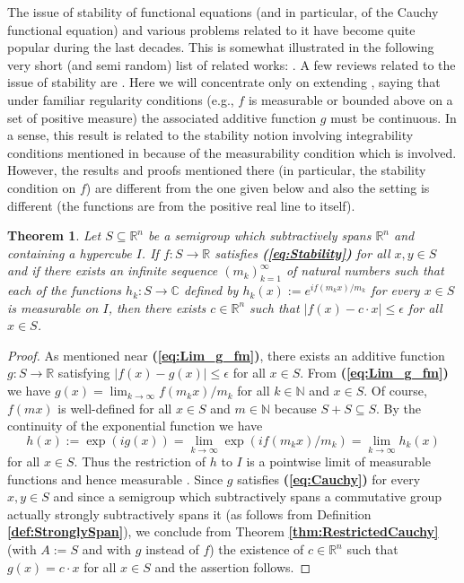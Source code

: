 \documentclass[12 pt]{amsart}
\newtheorem{thm}{Theorem}[section]
\theoremstyle{definition}
\newcommand{\R}{\mathbb{R}}
\newcommand{\C}{\mathbb{C}}
\newcommand{\N}{\mathbb{N}}
\newcommand{\bref}[1]{\textbf{\ref{#1}}} %
\newcommand{\beqref}[1]{\textbf{(\ref{#1})}} %
\begin{document}
The issue of stability of functional equations (and in particular, of the Cauchy 
functional equation) and various problems related 
to it have become quite popular during the 
last decades. This is somewhat illustrated in the following very short (and semi random) list of related works: \cite{Aoki1950,ArriolaBeyer2005-6,Badora2000,BGP2003jour,Bourgin1951,Chung2012,DalesMoslehian2007jour,Gajda1988,Ger1993jour,
GerSikorska1997,MaligrandaAM2008,MihetRadu2008jour,MirmostafaeeMoslehian2009jour,MoslehianRassias2007jour,NajatiRahimi2008,Paneah2009,Rhassias1978,Tabors2008}. 
A few reviews related to the issue of stability are  \cite{Forti1995,HIR1998,HyersRassias1992,Szekelyhidi2000incol}. 
Here  we will concentrate only on extending \cite[Theorem 17.1.2, p. 485]{Kuczma2009book}, saying that under 
familiar regularity conditions (e.g., $f$ is measurable or bounded above on a set 
of positive measure) the associated additive function $g$ must be continuous. In a sense, this result 
is related to the stability notion involving integrability conditions mentioned in \cite{ABR1995,Elliott1984} 
because of the measurability condition which is involved. However, the results and proofs mentioned 
there (in particular, the stability condition on $f$) are different from the one given below and also the setting is different (the functions are from the positive real line to itself). 

\begin{thm}\label{thm:Stability}
Let $S\subseteq \R^n$ be a semigroup which subtractively spans $\R^n$ and containing 
a hypercube $I$. If $f:S\to\R$ satisfies \beqref{eq:Stability} for all $x,y\in S$ and if there exists an infinite sequence $(m_k)_{k=1}^{\infty}$ of natural numbers such that each of the functions  $h_k:S\to\C$ defined by $h_k(x):=e^{if(m_kx)/m_k}$ for every $x\in S$  is measurable on $I$, then there 
exists $c\in\R^n$ such that $|f(x)-c\cdot x|\leq \epsilon$ for all $x\in S$.  
\end{thm}
\begin{proof}
 As mentioned near \beqref{eq:Lim_g_fm}, there exists an additive function $g:S\to\R$ satisfying  $|f(x)-g(x)|\leq \epsilon$ for all $x\in S$. 
From \beqref{eq:Lim_g_fm}  we have $g(x)=\lim_{k\to\infty}f(m_k x)/m_k$ 
for all $k\in \N$ and $x\in S$. Of course, $f(mx)$ is well-defined for all $x\in S$ and $m\in \N$ because $S+S\subseteq S$. By the continuity of the exponential function we have 
\begin{equation*}
h(x):=\exp(ig(x))=\lim_{k\to\infty}\exp(if(m_k x)/m_k)=\lim_{k\to\infty}h_k(x)  
\end{equation*}
for all $x\in S$. Thus the restriction of $h$ to $I$ is a pointwise limit of measurable 
functions and hence measurable \cite[p. 15]{Rudin1987book}. Since $g$ satisfies \beqref{eq:Cauchy} for every $x,y\in S$  
 and since a semigroup which subtractively spans a commutative group actually strongly 
subtractively spans it (as follows from Definition \bref{def:StronglySpan}), we conclude from 
Theorem \bref{thm:RestrictedCauchy} (with $A:=S$ and with $g$ instead of $f$) the existence of $c\in\R^n$ such that $g(x)=c\cdot x$ for all $x\in S$ 
 and the assertion follows.  
\end{proof}
\end{document}
